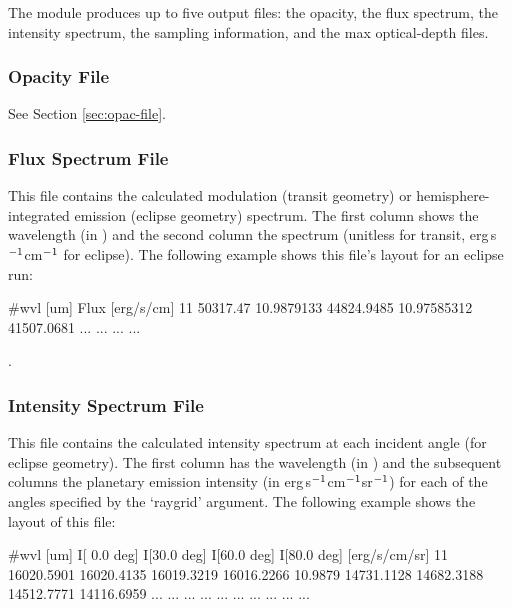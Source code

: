 \documentclass[letterpaper, 12pt]{article}
\begin{document}
The {\transit} module produces up to five output files: the opacity,
the flux spectrum, the intensity spectrum, the sampling information,
and the max optical-depth files.

\subsubsection{Opacity File}
See Section \ref{sec:opac-file}.

\subsubsection{Flux Spectrum File}

This file contains the calculated modulation (transit geometry) or
hemisphere-integrated emission (eclipse geometry) spectrum.  The first
column shows the wavelength (in {\microns}) and the second column the
spectrum (unitless for transit, erg\,s$\sp{-1}$cm$\sp{-1}$ for
eclipse).  The following example shows this file's layout for an
eclipse run:

\begin{plain}
#wvl [um]      Flux [erg/s/cm]
11             50317.47          
10.9879133     44824.9485        
10.97585312    41507.0681        
    ...           ...
    ...           ...
\end{plain} 
\phantom{.\\}%
.

\subsubsection{Intensity Spectrum File}

This file contains the calculated intensity spectrum at each incident
angle (for eclipse geometry).  The first column has the wavelength (in
{\microns}) and the subsequent columns the planetary emission
intensity (in erg\,s$\sp{-1}$cm$\sp{-1}$sr$\sp{-1}$) for each of the
angles specified by the `{\tttb raygrid}' argument.  The following
example shows the layout of this file:

\begin{plain}
#wvl [um]  I[ 0.0 deg]  I[30.0 deg]  I[60.0 deg]  I[80.0 deg]  [erg/s/cm/sr]
11         16020.5901   16020.4135   16019.3219   16016.2266          
10.9879    14731.1128   14682.3188   14512.7771   14116.6959         
    ...       ...           ...         ...           ...      
    ...       ...           ...         ...           ...      
\end{plain}  
\phantom{.\\}  %
\end{document}

